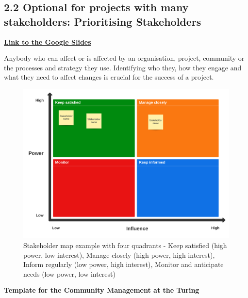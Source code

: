 \documentclass[
  letterpaper,
  DIV=11,
  numbers=noendperiod]{scrreport}
\begin{document}
\hypertarget{optional-for-projects-with-many-stakeholders-prioritising-stakeholders}{%
\subsection{\texorpdfstring{\textbf{2.2 Optional for projects with many
stakeholders: Prioritising
Stakeholders}}{2.2 Optional for projects with many stakeholders: Prioritising Stakeholders}}\label{optional-for-projects-with-many-stakeholders-prioritising-stakeholders}}

\href{https://docs.google.com/presentation/d/1BO-_VtRL-WrcpoEzSv_4ZCcEEg8QaZepeRGx6rB9grQ/edit\#slide=id.g1072083f421_1_0}{\textbf{Link
to the Google Slides}}

Anybody who can affect or is affected by an organisation, project,
community or the processes and strategy they use. Identifying who they,
how they engage and what they need to affect changes is crucial for the
success of a project.

\begin{figure}

{\centering \includegraphics{quarto_files/images/stakeholder-map-lucidspark.png}

}

\caption{Stakeholder map example with four quadrants - Keep satisfied
(high power, low interest), Manage closely (high power, high interest),
Inform regularly (low power, high interest), Monitor and anticipate
needs (low power, low interest)}

\end{figure}

\textbf{Template for the Community Management at the Turing}
\end{document}
